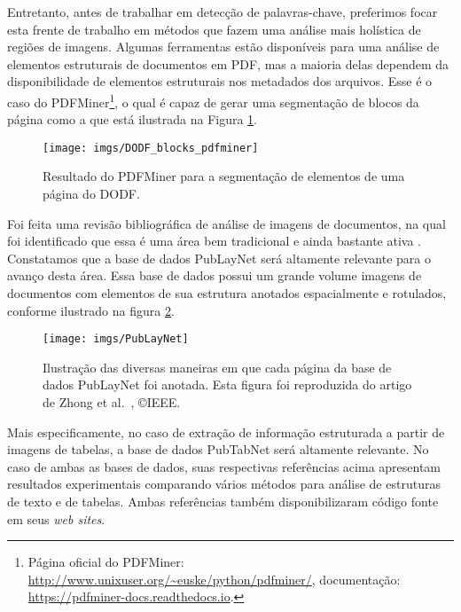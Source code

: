 \documentclass[12pt]{article}
\begin{document}
Entretanto, antes de trabalhar em detecção de palavras-chave, preferimos focar 
esta frente de trabalho em métodos que fazem uma análise 
mais holística de regiões de imagens. 
Algumas ferramentas estão disponíveis para uma análise de elementos
estruturais de documentos em PDF, mas a maioria delas dependem da disponibilidade de elementos estruturais nos metadados dos arquivos. Esse é o caso do PDFMiner\footnote{Página oficial do PDFMiner: \url{http://www.unixuser.org/~euske/python/pdfminer/}, documentação: \url{https://pdfminer-docs.readthedocs.io}.}, o qual é capaz de gerar 
uma segmentação de blocos da página como a que está ilustrada na Figura \ref{fig:DODF_blocks_pdfminer}.

\begin{figure}
    \centering
    \texttt{[image: imgs/DODF\_blocks\_pdfminer]}
    \caption{Resultado do PDFMiner para a segmentação de elementos de uma página do DODF.} 
    \label{fig:DODF_blocks_pdfminer}
\end{figure}

Foi feita uma revisão bibliográfica de análise de imagens de documentos, na qual
foi identificado que essa é uma área bem tradicional e ainda bastante 
ativa \cite{gonccalo2018survey,liao2017textboxes,Zhou_etal_EAST_CVPR_2017,harley2015icdar,tensmeyer2017,noce2016,o1995document,nagy2000twenty,papadopoulos2013impact,antonacopoulos2009realistic,beccaloni10,clausner2015enp,dimmick1991nist,brunessaux2014maurdor,Wiedemann_PageStream}.
Constatamos que a base de dados PubLayNet \cite{zhong_etal_PubLayNet_icdar2019} será
altamente relevante para o avanço desta área.
Essa base de dados possui um grande volume imagens de documentos
com elementos de sua estrutura anotados espacialmente e rotulados, conforme ilustrado na figura \ref{fig:PubLayNet}.

\begin{figure}
    \centering
    \texttt{[image: imgs/PubLayNet]}
    \caption{Ilustração das diversas maneiras em que cada página da base de dados PubLayNet foi anotada. Esta figura foi reproduzida do artigo de Zhong et al.~\cite{zhong_etal_PubLayNet_icdar2019}, \copyright IEEE.}
    \label{fig:PubLayNet}
\end{figure}

Mais especificamente, no caso de extração de informação estruturada a partir
de imagens de tabelas, a base de dados PubTabNet \cite{zhong_etal_PubTabNet_arXiv2019}
será altamente relevante. No caso de ambas as bases de dados, suas respectivas
referências acima apresentam resultados experimentais comparando vários
métodos para análise de estruturas de texto e de tabelas. 
Ambas referências também disponibilizaram código fonte em seus {\em web sites}.
\end{document}

